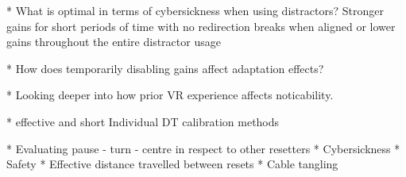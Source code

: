    * What is optimal in terms of cybersickness when using distractors? Stronger gains for short periods of time with no redirection breaks when aligned or lower gains throughout the entire distractor usage
   
   * How does temporarily disabling gains affect adaptation effects?
   
   * Looking deeper into how prior VR experience affects noticability. 
   
   * effective and short Individual DT calibration methods
   
   * Evaluating pause - turn - centre in respect to other resetters
      * Cybersickness
      * Safety
      * Effective distance travelled between resets
      * Cable tangling